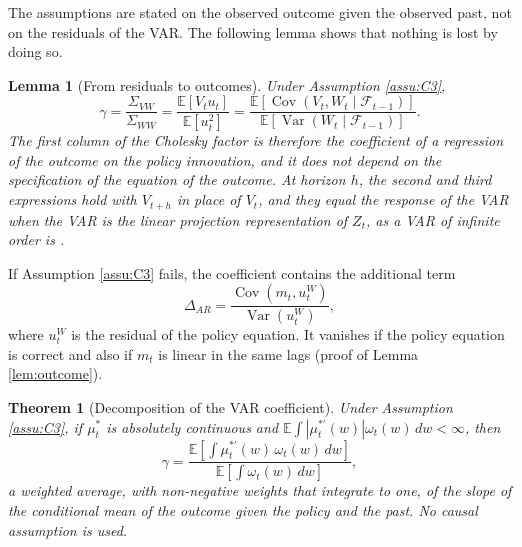 \documentclass[12pt,a4paper]{article}
\newtheorem{thm}{Theorem}
\newtheorem{lem}{Lemma}
\theoremstyle{definition}
\newcommand{\E}{\mathbb{E}}
\newcommand{\cov}{\operatorname{Cov}}
\newcommand{\var}{\operatorname{Var}}
\begin{document}
The assumptions are stated on the observed outcome given the observed past, not on the residuals of the VAR. The following lemma shows that nothing is lost by doing so.

\begin{lem}[From residuals to outcomes\label{lem:outcome}]
Under Assumption \ref{assu:C3},
\begin{equation}
\gamma=\frac{\Sigma_{VW}}{\Sigma_{WW}}=\frac{\E[V_tu_t]}{\E[u_t^2]}=\frac{\E[\cov(V_t,W_t\mid\mathcal{F}_{t-1})]}{\E[\var(W_t\mid\mathcal{F}_{t-1})]}.
\label{eq:gamma-bridge}
\end{equation}
The first column of the Cholesky factor is therefore the coefficient of a regression of the outcome on the policy innovation, and it does not depend on the specification of the equation of the outcome. At horizon $h$, the second and third expressions hold with $V_{t+h}$ in place of $V_t$, and they equal the response of the VAR when the VAR is the linear projection representation of $Z_t$, as a VAR of infinite order is \citep{PlagborgMollerWolf2021}.
\end{lem}

If Assumption \ref{assu:C3} fails, the coefficient contains the additional term
\[
\Delta_{AR}=\frac{\cov(m_t,u_t^W)}{\var(u_t^W)},
\]
where $u_t^W$ is the residual of the policy equation. It vanishes if the policy equation is correct and also if $m_t$ is linear in the same lags (proof of Lemma \ref{lem:outcome}).

\begin{thm}[Decomposition of the VAR coefficient\label{thm:weights}]
Under Assumption \ref{assu:C3}, if $\mu_t^\ast$ is absolutely continuous and $\E\int|\mu_t^{\ast\prime}(w)|\omega_t(w)\,dw<\infty$, then
\begin{equation}
\gamma=\frac{\E\left[\int\mu_t^{\ast\prime}(w)\,\omega_t(w)\,dw\right]}{\E\left[\int\omega_t(w)\,dw\right]},
\label{eq:weights}
\end{equation}
a weighted average, with non-negative weights that integrate to one, of the slope of the conditional mean of the outcome given the policy and the past. No causal assumption is used.
\end{thm}
\end{document}

